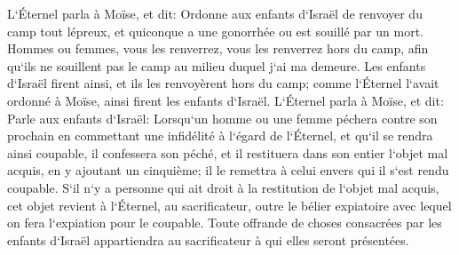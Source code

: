 \verse L`Éternel parla à Moïse, et dit: 
\verse Ordonne aux enfants d`Israël de renvoyer du camp tout lépreux, et quiconque a une gonorrhée ou est souillé par un mort. 
\verse Hommes ou femmes, vous les renverrez, vous les renverrez hors du camp, afin qu`ils ne souillent pas le camp au milieu duquel j`ai ma demeure. 
\verse Les enfants d`Israël firent ainsi, et ils les renvoyèrent hors du camp; comme l`Éternel l`avait ordonné à Moïse, ainsi firent les enfants d`Israël. 
\verse L`Éternel parla à Moïse, et dit: 
\verse Parle aux enfants d`Israël: Lorsqu`un homme ou une femme péchera contre son prochain en commettant une infidélité à l`égard de l`Éternel, et qu`il se rendra ainsi coupable, 
\verse il confessera son péché, et il restituera dans son entier l`objet mal acquis, en y ajoutant un cinquième; il le remettra à celui envers qui il s`est rendu coupable. 
\verse S`il n`y a personne qui ait droit à la restitution de l`objet mal acquis, cet objet revient à l`Éternel, au sacrificateur, outre le bélier expiatoire avec lequel on fera l`expiation pour le coupable. 
\verse Toute offrande de choses consacrées par les enfants d`Israël appartiendra au sacrificateur à qui elles seront présentées. 
